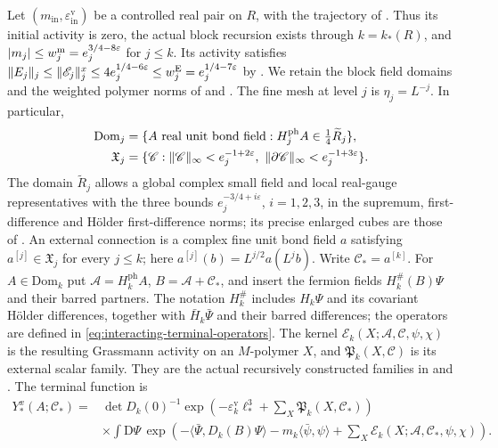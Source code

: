 \documentclass[11pt,letterpaper,reqno]{amsart}
\begin{document}
Let $(m_{\mathrm{in}},\varepsilon_{\mathrm{in}}^{\mathrm v})$
be a controlled real pair on $R$, with the trajectory
of \cite[\S7.1]{CoverTuning}. Thus its initial activity is zero,
the actual block recursion exists through $k=k_*(R)$, and
$|m_j|\le w_j^{\rm m}=e_j^{3/4-8\varepsilon}$ for $j\le k$.
Its activity satisfies
$\|E_j\|_j\le\|\mathscr E_j\|_j^x\le
4e_j^{1/4-6\varepsilon}\le w_j^{\rm E}
=e_j^{1/4-7\varepsilon}$
by \cite[Proposition~7.1]{CoverTuning}.
We retain the block field domains and the weighted polymer
norms of \cite[\S2.2--2.3]{NormalizedContraction} and \cite[\S2.3, \S5.1]{NonlinearStep}. The fine mesh at level
$j$ is $\eta_j=L^{-j}$. In particular,
\begin{align*}
 \mathrm{Dom}_j
  &=\{A\text{ real unit bond field}:
           H_j^{\rm ph}A\in\tfrac14\widetilde R_j\},\\*
 \mathfrak X_j
  &=\{\mathscr C:\|\mathscr C\|_\infty<e_j^{-1+2\varepsilon},\
                 \|\partial\mathscr C\|_\infty<e_j^{-1+3\varepsilon}\}.
\end{align*}
The domain $\widetilde R_j$ allows a global complex small field
and local real-gauge representatives with the three bounds
$e_j^{-3/4+i\varepsilon}$, $i=1,2,3$, in the supremum,
first-difference and H\"older first-difference norms;
its precise enlarged cubes are those of
\cite[\S6]{MaxwellBlock}.
An external connection is a complex fine unit bond
field $a$ satisfying
$a^{[j]}\in\mathfrak X_j$ for every $j\le k$;
here $a^{[j]}(b)=L^{j/2}a(L^jb)$.
Write $\mathscr C_*=a^{[k]}$.
For $A\in\mathrm{Dom}_k$ put
$\mathscr A=H_k^{\mathrm{ph}}A$,
$B=\mathscr A+\mathscr C_*$, and insert the fermion
fields $H_k^\#(B)\Psi$ and their barred partners.
The notation $H_k^\#$ includes $H_k\Psi$ and its covariant
H\"older differences, together with
$\bar H_k\bar\Psi$ and their barred differences;
the operators are defined in
\eqref{eq:interacting-terminal-operators}.
The kernel $\mathscr E_k(X;\mathscr A,\mathscr C,\psi,\chi)$
is the resulting Grassmann activity on an $M$-polymer $X$,
and $\mathfrak P_k(X,\mathscr C)$ is its external scalar family.
They are the actual recursively constructed families in
\cite[(7)]{NonlinearStep} and \cite[(55)--(57)]{CoverTuning}.
The terminal function is
\begin{align}
 Y_*^x(A;\mathscr C_*)
   ={}&\det D_k(0)^{-1}
        \exp\left(-\varepsilon_k^{\mathrm v}\ell_*^3
                       +\sum_X\mathfrak P_k(X,\mathscr C_*)\right)
       \nonumber\\
   &\times\int\mathrm D\Psi\,
      \exp\left(-\langle\bar\Psi,D_k(B)\Psi\rangle
                -m_k\langle\bar\psi,\psi\rangle
                       +\sum_X\mathscr E_k(X;\mathscr A,\mathscr C_*,
                                                        \psi,\chi)\right).
                                      \label{eq:term-Y-density}
\end{align}
\end{document}
